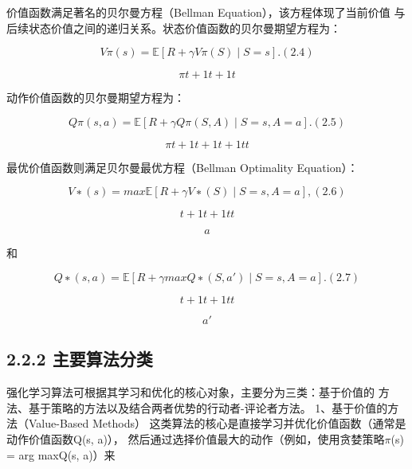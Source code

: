 \documentclass[12pt,a4paper,openright,UTF8]{ctexbook}
\begin{document}
价值函数满足著名的贝尔曼方程（Bellman Equation），该方程体现了当前价值 与后续状态价值之间的递归关系。状态价值函数的贝尔曼期望方程为：

\begin{equation*}
V\pi(s) = \mathbb{E}[R + \gamma V\pi(S) \mid S= s] .(2.4)
\end{equation*}

\begin{equation*}
\pi t+1t+1t
\end{equation*}

动作价值函数的贝尔曼期望方程为：

\begin{equation*}
Q\pi(s, a) = \mathbb{E}[R + \gamma Q\pi(S, A) \mid S= s, A= a] .(2.5)
\end{equation*}

\begin{equation*}
\pi t+1t+1t+1tt
\end{equation*}

最优价值函数则满足贝尔曼最优方程（Bellman Optimality Equation）：

\begin{equation*}
V∗(s) = max\mathbb{E}[R + \gamma V∗(S) \mid S= s, A= a] ,(2.6)
\end{equation*}

\begin{equation*}
t+1t+1tt
\end{equation*}

\begin{equation*}
a
\end{equation*}

和

\begin{equation*}
Q∗(s, a) = \mathbb{E}[R + \gamma max Q∗(S, a') \mid S= s, A= a] .(2.7)
\end{equation*}

\begin{equation*}
t+1t+1tt
\end{equation*}

\begin{equation*}
a'
\end{equation*}

\subsection{2.2.2 主要算法分类}

强化学习算法可根据其学习和优化的核心对象，主要分为三类：基于价值的 方法、基于策略的方法以及结合两者优势的行动者-评论者方法。 1、基于价值的方法（Value-Based Methods） 这类算法的核心是直接学习并优化价值函数（通常是动作价值函数Q(s, a)）， 然后通过选择价值最大的动作（例如，使用贪婪策略$\pi$(s) = arg maxQ(s, a)）来
\end{document}
